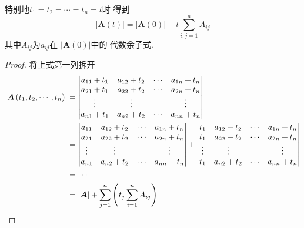 {特别地$
    t_1 = t_2 = \cdots = t_n = t
$时
得到
\[
    \left|\bm{A}\left(t\right)\right|
    =\left|\bm{A}\left(0\right)\right|
    +t\sum_{i,j=1}^{n}A_{ij}
\]
其中$A_{ij}$为$a_{ij}$在
$\left|\bm{A}\left(0\right)\right|$中的
代数余子式.\begin{proof}
    将上式第一列拆开
    \begin{align*}
        \left|\bm{A}\left(
        t_1,t_2,\cdots,t_n
        \right)\right|
         & =\begin{vmatrix}
                a_{11}+t_1 & a_{12}+t_2 &
                \cdots     & a_{1n}+t_n              \\
                a_{21}+t_1 & a_{22}+t_2 &
                \cdots     & a_{2n}+t_n              \\
                \vdots     & \vdots     &   & \vdots \\
                a_{n1}+t_1 & a_{n2}+t_2 &
                \cdots     & a_{nn}+t_n
            \end{vmatrix} \\
         & =\begin{vmatrix}
                a_{11} & a_{12}+t_2 &
                \cdots & a_{1n}+t_n              \\
                a_{21} & a_{22}+t_2 &
                \cdots & a_{2n}+t_n              \\
                \vdots & \vdots     &   & \vdots \\
                a_{n1} & a_{n2}+t_2 &
                \cdots & a_{nn}+t_n
            \end{vmatrix}+
        \begin{vmatrix}
            t_1    & a_{12}+t_2 &
            \cdots & a_{1n}+t_n              \\
            t_1    & a_{22}+t_2 &
            \cdots & a_{2n}+t_n              \\
            \vdots & \vdots     &   & \vdots \\
            t_1    & a_{n2}+t_2 &
            \cdots & a_{nn}+t_n
        \end{vmatrix}         \\
         & =\cdots                               \\
         & =\left|\bm{A}\right|
        +\sum_{j=1}^{n}\left(
        t_j\sum_{i=1}^{n}
        A_{ij}
        \right)\qedhere
    \end{align*}
\end{proof}
}
